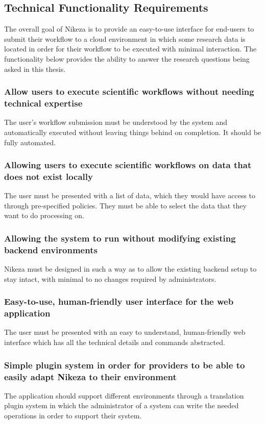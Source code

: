 \subsection{Technical Functionality Requirements}

The overall goal of Nikeza is to provide an easy-to-use interface for end-users to submit their workflow to a cloud environment in which some research data is located in order for their workflow to be executed with minimal interaction. The functionality below provides the ability to answer the research questions being asked in this thesis.

\subsubsection{Allow users to execute scientific workflows without needing technical expertise}

The user's workflow submission must be understood by the system and automatically executed without leaving things behind on completion. It should be fully automated.

\subsubsection{Allowing users to execute scientific workflows on data that does not exist locally}

The user must be presented with a list of data, which they would have access to through pre-specified policies. They must be able to select the data that they want to do processing on.

\subsubsection{Allowing the system to run without modifying existing backend environments}

Nikeza must be designed in such a way as to allow the existing backend setup to stay intact, with minimal to no changes required by administrators. 

\subsubsection{Easy-to-use, human-friendly user interface for the web application}

The user must be presented with an easy to understand, human-friendly web interface which has all the technical details and commands abstracted.

\subsubsection{Simple plugin system in order for providers to be able to easily adapt Nikeza to their environment}

The application should support different environments through a translation plugin system in which the administrator of a system can write the needed operations in order to support their system.